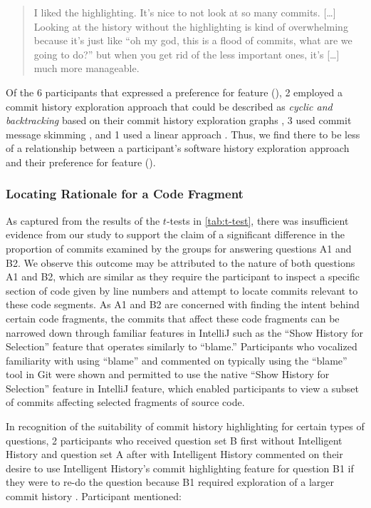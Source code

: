 \begin{quote}
  I liked the highlighting. 
  It’s nice to not look at so many commits. 
  [\dots] Looking at the history without the highlighting is kind of overwhelming because it’s just like ``oh my god, this is a flood of commits, 
  what are we going to do?'' 
  but when you get rid of the less important ones, it’s [\dots] much more manageable.
\end{quote}

Of the 6 participants that expressed a preference for feature (), 
2 employed a commit history exploration approach that could be described as \textit{cyclic and backtracking} based on their commit history exploration graphs ,
3 used commit message skimming , and 1 used a linear approach .
Thus, we find there to be less of a relationship between a participant's software history exploration approach 
and their preference for feature ().

\subsubsection{Locating Rationale for a Code Fragment}

As captured from the results of the $t$-tests in \autoref{tab:t-test}, 
there was insufficient evidence from our study to support the claim of a significant difference in 
the proportion of commits examined by the groups for answering questions A1 and B2.
We observe this outcome may be attributed to the nature of both questions A1 and B2, 
which are similar as they require the participant to  inspect a specific section of code 
given by line numbers and attempt to locate commits relevant to these code segments.
As A1 and B2 are concerned with finding the intent behind certain code fragments, 
the commits that affect these code fragments can be narrowed down
through familiar features in IntelliJ such as the ``Show History for Selection'' feature 
that operates similarly to  ``blame.''
Participants who vocalized familiarity with using  ``blame'' and commented on typically
using the ``blame'' tool in Git were shown and permitted to use the native 
``Show History for Selection'' feature in IntelliJ feature, 
which enabled participants to view a subset of commits affecting selected fragments of source code.

In recognition of the suitability of commit history highlighting for certain types of questions,
2 participants who received question set B first without Intelligent History and question set A 
after with Intelligent History commented on their desire to use Intelligent History's commit highlighting feature for question B1
if they were to re-do the question because B1 required exploration of a larger commit history .
Participant  mentioned:

